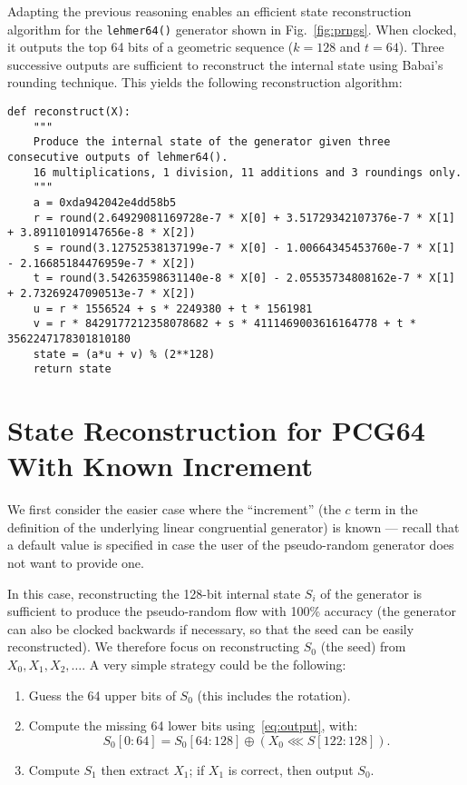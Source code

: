 \documentclass[journal=tosc,final]{iacrtrans}
\begin{document}
Adapting the previous reasoning enables an efficient state reconstruction
algorithm for the \texttt{lehmer64()} generator shown in
Fig.~\ref{fig:prngs}. When clocked, it outputs the top 64 bits of a geometric
sequence ($k=128$ and $t=64$). Three successive outputs are sufficient to
reconstruct the internal state using Babai's rounding technique. This yields the
following reconstruction algorithm:
\begin{verbatim}
def reconstruct(X):
    """
    Produce the internal state of the generator given three consecutive outputs of lehmer64().
    16 multiplications, 1 division, 11 additions and 3 roundings only.
    """
    a = 0xda942042e4dd58b5
    r = round(2.64929081169728e-7 * X[0] + 3.51729342107376e-7 * X[1] + 3.89110109147656e-8 * X[2])
    s = round(3.12752538137199e-7 * X[0] - 1.00664345453760e-7 * X[1] - 2.16685184476959e-7 * X[2])
    t = round(3.54263598631140e-8 * X[0] - 2.05535734808162e-7 * X[1] + 2.73269247090513e-7 * X[2])
    u = r * 1556524 + s * 2249380 + t * 1561981
    v = r * 8429177212358078682 + s * 4111469003616164778 + t * 3562247178301810180
    state = (a*u + v) % (2**128)
    return state
\end{verbatim}


\section{State Reconstruction for \textsf{PCG64} With Known Increment}
\label{sec:Cknown}

We first consider the easier case where the ``increment'' (the $c$ term in the
definition of the underlying linear congruential generator) is known --- recall
that a default value is specified in case the user of the pseudo-random
generator does not want to provide one.

In this case, reconstructing the 128-bit internal state $S_i$ of the generator
is sufficient to produce the pseudo-random flow with 100\% accuracy (the
generator can also be clocked backwards if necessary, so that the seed can be
easily reconstructed). We therefore focus on reconstructing $S_0$ (the seed)
from $X_0, X_1, X_2, \dots$. A very simple strategy could be the following:
\begin{enumerate}
\item Guess the 64 upper bits of $S_0$ (this includes the rotation).
\item Compute the missing 64 lower bits using~\eqref{eq:output}, with:
\[
   S_0[0:64] = S_0[64:128] \oplus (X_0  \lll S[122:128]).
\]
\item Compute $S_1$ then extract $X_1$; if $X_1$ is correct, then output $S_0$.
\end{enumerate}
\end{document}
